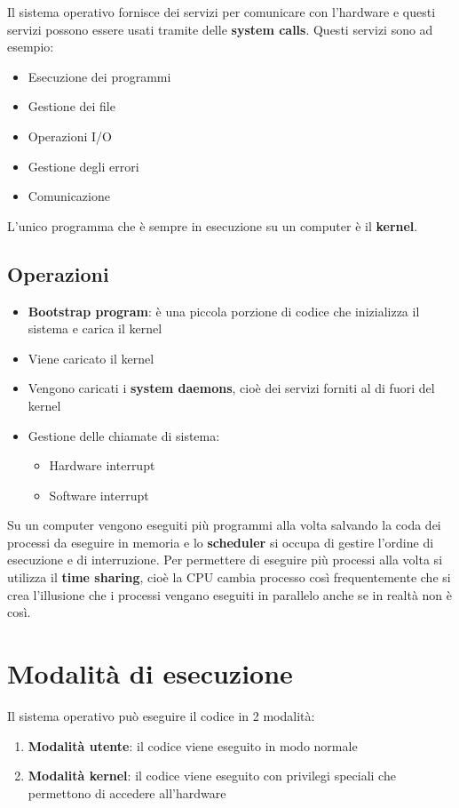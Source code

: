 \documentclass[a4paper]{article}
\begin{document}
\noindent
Il sistema operativo fornisce dei servizi per comunicare con l'hardware e questi
servizi possono essere usati tramite delle \textbf{system calls}. Questi servizi
sono ad esempio:

\begin{itemize}
  \item Esecuzione dei programmi
  \item Gestione dei file
  \item Operazioni I/O
  \item Gestione degli errori
  \item Comunicazione
\end{itemize}

\noindent
L'unico programma che è sempre in esecuzione su un computer è il \textbf{kernel}.

\subsection{Operazioni}
\begin{itemize}
  \item \textbf{Bootstrap program}: è una piccola porzione di codice che inizializza
    il sistema e carica il kernel

  \item Viene caricato il kernel

  \item Vengono caricati i \textbf{system daemons}, cioè dei servizi forniti al
    di fuori del kernel

  \item Gestione delle chiamate di sistema:
    \begin{itemize}
      \item Hardware interrupt
      \item Software interrupt
    \end{itemize}
\end{itemize}

\noindent
Su un computer vengono eseguiti più programmi alla volta salvando la coda dei
processi da eseguire in memoria e lo \textbf{scheduler} si occupa di gestire
l'ordine di esecuzione e di interruzione. Per permettere di eseguire più processi
alla volta si utilizza il \textbf{time sharing}, cioè la CPU cambia processo così
frequentemente che si crea l'illusione che i processi vengano eseguiti in parallelo
anche se in realtà non è così.

\section{Modalità di esecuzione}
Il sistema operativo può eseguire il codice in 2 modalità:
\begin{enumerate}
  \item \textbf{Modalità utente}: il codice viene eseguito in modo normale
  \item \textbf{Modalità kernel}: il codice viene eseguito con privilegi speciali
    che permettono di accedere all'hardware
\end{enumerate}
\end{document}
